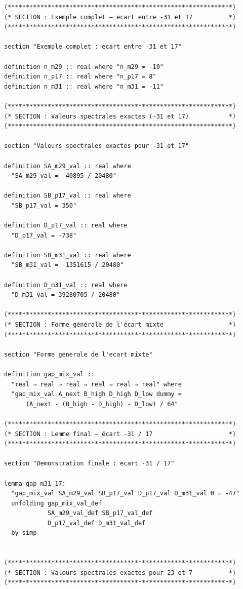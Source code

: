 \documentclass[a4paper,11pt]{article}
\begin{document}
\begin{holcode}[title={\textcolor{white}{Fichier : methode\_spectral.thy -- Partie 6/6 (FIN)}}]
\begin{lstlisting}
(**************************************************************)
(* SECTION : Exemple complet – ecart entre -31 et 17          *)
(**************************************************************)

section "Exemple complet : ecart entre -31 et 17"

definition n_m29 :: real where "n_m29 = -10"
definition n_p17 :: real where "n_p17 = 8"
definition n_m31 :: real where "n_m31 = -11"

(**************************************************************)
(* SECTION : Valeurs spectrales exactes (-31 et 17)           *)
(**************************************************************)

section "Valeurs spectrales exactes pour -31 et 17"

definition SA_m29_val :: real where
  "SA_m29_val = -40895 / 20480"

definition SB_p17_val :: real where
  "SB_p17_val = 350"

definition D_p17_val :: real where
  "D_p17_val = -738"

definition SB_m31_val :: real where
  "SB_m31_val = -1351615 / 20480"

definition D_m31_val :: real where
  "D_m31_val = 39280705 / 20480"

(**************************************************************)
(* SECTION : Forme générale de l'écart mixte                  *)
(**************************************************************)

section "Forme generale de l'ecart mixte"

definition gap_mix_val ::
  "real ⇒ real ⇒ real ⇒ real ⇒ real ⇒ real" where
  "gap_mix_val A_next B_high D_high D_low dummy =
      (A_next - (B_high - D_high) - D_low) / 64"

(**************************************************************)
(* SECTION : Lemme final – écart -31 / 17                     *)
(**************************************************************)

section "Demonstration finale : ecart -31 / 17"

lemma gap_m31_17:
  "gap_mix_val SA_m29_val SB_p17_val D_p17_val D_m31_val 0 = -47"
  unfolding gap_mix_val_def
            SA_m29_val_def SB_p17_val_def
            D_p17_val_def D_m31_val_def
  by simp


(**************************************************************)
(* SECTION : Valeurs spectrales exactes pour 23 et 7          *)
(**************************************************************)


\end{lstlisting}
\end{holcode}
\end{document}
